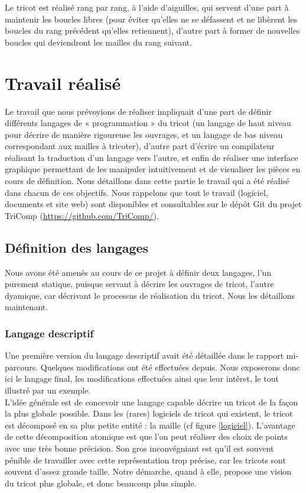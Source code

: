 \documentclass{article}
\begin{document}
Le tricot est réalisé rang par rang, à l'aide d'aiguilles, qui servent 
d'une part à maintenir les boucles libres (pour éviter qu'elles ne se 
défassent et ne libèrent les boucles du rang précédent qu'elles retiennent), 
d'autre part à former de nouvelles boucles qui deviendront les mailles du rang 
suivant.

\newpage

\section{Travail réalisé}

Le travail que nous prévoyions de réaliser impliquait d'une part de
définir différents langages de « programmation » du tricot (un langage
de haut niveau pour décrire de manière rigoureuse les ouvrages, et un
langage de bas niveau correspondant aux mailles à tricoter), d'autre
part d'écrire un compilateur réalisant la traduction d'un langage vers
l'autre, et enfin de réaliser une interface graphique permettant de
les manipuler intuitivement et de visualiser les pièces en cours de
définition.  Nous détaillons dans cette partie le travail qui a été
réalisé dans chacun de ces objectifs. Nous rappelons que tout le
travail (logiciel, documents et site web) sont disponibles et
consultables sur le dépôt Git du projet
TriComp (\url{https://github.com/TriComp/}).

\subsection{Définition des langages}

Nous avons été amenés au cours de ce projet à définir deux langages,
l'un purement statique, puisque servant à décrire les ouvrages de
tricot, l'autre dyamique, car décrivant le processus de réalisation du
tricot. Nous les détaillons maintenant.

\subsubsection{Langage descriptif}

Une première version du langage descriptif avait été détaillée dans le
rapport mi-parcours. Quelques modifications ont été effectuées
depuis. Nous exposerons donc ici le langage final, les modifications
effectuées ainsi que leur intêret, le tout illustré par un exemple. \\

L'idée générale est de concevoir une langage capable décrire un tricot
de la façon la plus globale possible. Dans les (rares) logiciels de
tricot qui existent, le tricot est décomposé en sa plus petite entité
: la maille (cf figure \ref{logiciel}). L'avantage de cette
décomposition atomique est que l'on peut réaliser des choix de points
avec une très bonne précision.
 Son gros inconvégniant est qu'il est souvent
pénible de travailler avec cette représentation trop précise, car les tricots 
sont souvent d'assez grande taille. %
Notre démarche, quand à elle, propose une vision du tricot plus globale, 
et donc beaucoup plus simple.
\end{document}

